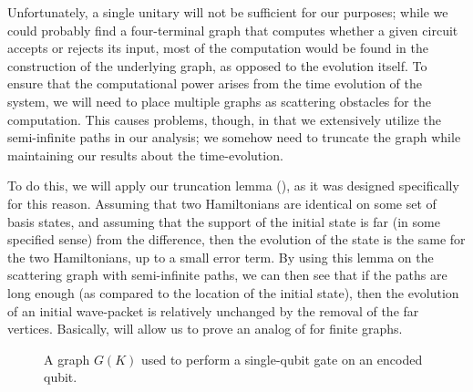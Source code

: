 \documentclass[../thesis-main/thesis-main]{subfiles}
\begin{document}
Unfortunately, a single unitary will not be sufficient for our purposes; while we could probably find a four-terminal graph that computes whether a given circuit accepts or rejects its input, most of the computation would be found in the construction of the underlying graph, as opposed to the evolution itself.  To ensure that the computational power arises from the time evolution of the system, we will need to place multiple graphs as scattering obstacles for the computation.  This causes problems, though, in that we extensively utilize the semi-infinite paths in our analysis; we somehow need to truncate the graph while maintaining our results about the time-evolution.

To do this, we will apply our truncation lemma (), as it was designed specifically for this reason.  Assuming that two Hamiltonians are identical on some set of basis states, and assuming that the support of the initial state is far (in some specified sense) from the difference, then the evolution of the state is the same for the two Hamiltonians, up to a small error term.  By using this lemma on the scattering graph with semi-infinite paths, we can then see that if the paths are long enough (as compared to the location of the initial state), then the evolution of an initial wave-packet is relatively unchanged by the removal of the far vertices.  Basically,  will allow us to prove an analog of  for finite graphs.

\begin{figure}
  \centering
  
  \caption{A graph $G(K)$ used to perform a single-qubit gate on an encoded qubit. 
  \label{fig:single_qubit_scattering_graph}}
\end{figure}
\end{document}
